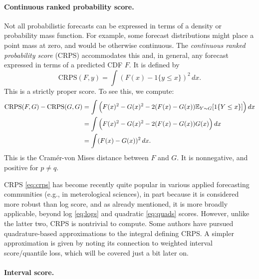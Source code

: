 \documentclass{article}
\begin{document}
\paragraph{Continuous ranked probability score.}

Not all probabilistic forecasts can be expressed in terms of a density or
probability mass function. For example, some forecast distributions might place
a point mass at zero, and would be otherwise continuous. The \emph{continuous
  ranked probability score} (CRPS) accommodates this and, in general, any
forecast expressed in terms of a predicted CDF $F$. It is defined by 
\begin{equation}
\label{eq:crps}
\mathrm{CRPS}(F, y) = \int (F(x) - 1\{y \leq x\})^2 \, dx. 
\end{equation}
This is a strictly proper score. To see this, we compute: 
\begin{align*}
\mathrm{CRPS}(F, G) - \mathrm{CRPS}(G ,G) 
&= \int \Big( F(x)^2 - G(x)^2 - 2(F(x) - G(x)) \mathbb{E}_{Y \sim G}[ 1\{Y \leq x\} ]
  \Big) \, dx \\
&= \int \Big( F(x)^2 - G(x)^2 - 2(F(x) - G(x)) G(x) \Big) \, dx \\
&= \int (F(x) - G(x))^2 \, dx.
\end{align*}
This is the Cram{\'e}r-von Mises distance between $F$ and $G$. It is
nonnegative, and positive for $p \not= q$.   

CRPS \eqref{eq:crps} has become recently quite popular in various applied
forecasting communities (e.g., in meterological sciences), in part because it is
considered more robust than log score, and as already mentioned, it is more
broadly applicable, beyond log \eqref{eq:logs} and quadratic \eqref{eq:quads}
scores. However, unlike the latter two, CRPS is nontrivial to compute. Some
authors have pursued quadrature-based approximations to the integral defining
CRPS. A simpler approximation is given by noting its connection to weighted
interval score/quantile loss, which will be covered just a bit later on.

\paragraph{Interval score.}
\end{document}
